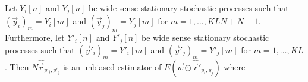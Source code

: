 \documentclass[a4paper, openany, oneside]{memoir}
\begin{document}
\begin{blockTheorem} 
    Let $Y_i[n]$ and $Y_j[n]$ be wide sense stationary stochastic processes such that $(\vec{y}_i)_m = Y_i[m]$ and $(\vec{y}_j)_m = Y_j[m]$ for $m=1,\ldots,KLN+N-1$. Furthermore, let $Y'_i[n]$ and $Y'_j[n]$ be wide sense stationary stochastic processes such that $(\vec{y}'_i)_m = Y'_i[m]$ and $(\vec{y}'_j)_m = Y'_j[m]$ for $m=1,\ldots,KL$. Then $N\hat{\vec{r}}_{y'_i,y'_j}$ is an unbiased estimator of $E( \vec{w} \odot \hat{\vec{r}}'_{y_i,y_j})$ where

\end{blockTheorem}
\end{document}
